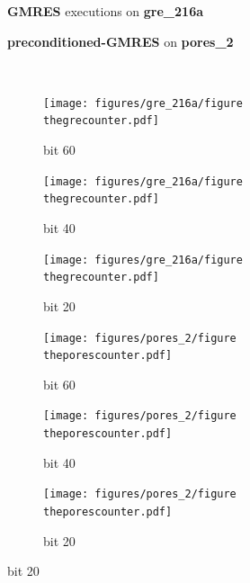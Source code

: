 \documentclass[twoside]{article}
\newcounter{fig}\setcounter{fig}{0}
\begin{document}
  \begin{figure}[H]
    \centering
    
    \begin{minipage}[b]{0.45\linewidth}
      \centering
      \textbf{GMRES} executions on \textbf{gre_216a} 
    \end{minipage}
    \quad
    \begin{minipage}{0.45\linewidth}
      \centering
      \textbf{preconditioned-GMRES} on \textbf{pores_2}
    \end{minipage}\\


    \begin{minipage}[b]{0.48\linewidth}
      \begin{subfigure}[t]{\linewidth}
        \centering
        \texttt{[image: figures/gre\_216a/figure\\thegrecounter.pdf]}
        \caption{bit 60}\label{fig:gre_216a_conv_hist_bit_0}		
      \end{subfigure}
      \quad
      \begin{subfigure}[t]{\linewidth}
        \centering
        \texttt{[image: figures/gre\_216a/figure\\thegrecounter.pdf]}
        \caption{bit 40}\label{fig:gre_216a_conv_hist_bit_1}
      \end{subfigure}
      \quad
      \begin{subfigure}[t]{\linewidth}
        \centering
        \texttt{[image: figures/gre\_216a/figure\\thegrecounter.pdf]}
        \caption{bit 20}\label{fig:gre_216a_conv_hist_bit_2}
      \end{subfigure}
    \end{minipage}
    \quad
    \begin{minipage}[b]{0.48\linewidth}
      \begin{subfigure}[t]{\linewidth}
        \centering
        \texttt{[image: figures/pores\_2/figure\\theporescounter.pdf]}
        \caption{bit 60}\label{fig:pores_2_conv_hist_bit_0}		
      \end{subfigure}
      \quad
      \begin{subfigure}[t]{\linewidth}
        \centering
        \texttt{[image: figures/pores\_2/figure\\theporescounter.pdf]}
        \caption{bit 40}\label{fig:pores_2_conv_hist_bit_1}
      \end{subfigure}
      \quad
      \begin{subfigure}[t]{\linewidth}
        \centering
        \texttt{[image: figures/pores\_2/figure\\theporescounter.pdf]}
        \caption{bit 20}\label{fig:pores_2_conv_hist_bit_2}
      \end{subfigure}


\end{minipage}
\end{figure}
\end{document}
